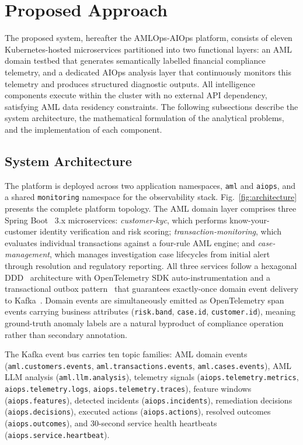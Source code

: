 \documentclass[a4paper,anonymous,UKenglish]{lipics-v2021}
\begin{document}
\section{Proposed Approach}
\label{sec:approach}

The proposed system, hereafter the AMLOps-AIOps platform, consists of eleven
Kubernetes-hosted microservices partitioned into two functional layers: an AML
domain testbed that generates semantically labelled financial compliance
telemetry, and a dedicated AIOps analysis layer that continuously monitors this
telemetry and produces structured diagnostic outputs. All intelligence
components execute within the cluster with no external API dependency,
satisfying AML data residency constraints. The following subsections describe
the system architecture, the mathematical formulation of the analytical
problems, and the implementation of each component.

\subsection{System Architecture}

The platform is deployed across two application namespaces, \texttt{aml} and
\texttt{aiops}, and a shared \texttt{monitoring} namespace for the
observability stack. Fig.~\ref{fig:architecture} presents the complete platform
topology. The AML domain layer comprises three Spring
Boot~\cite{springboot2014} 3.x microservices: \textit{customer-kyc}, which
performs know-your-customer identity verification and risk scoring;
\textit{transaction-monitoring}, which evaluates individual transactions against
a four-rule AML engine; and \textit{case-management}, which manages
investigation case lifecycles from initial alert through resolution and
regulatory reporting. All three services follow a hexagonal
DDD~\cite{evans2003ddd} architecture with OpenTelemetry SDK
auto-instrumentation and a transactional outbox
pattern~\cite{richardson2018microservices} that guarantees exactly-once domain
event delivery to Kafka~\cite{kafka2011,boten2022cloudnative}. Domain events
are simultaneously emitted as OpenTelemetry span events carrying business
attributes (\texttt{risk.band}, \texttt{case.id}, \texttt{customer.id}),
meaning ground-truth anomaly labels are a natural byproduct of compliance
operation rather than secondary annotation.

{\sloppy The Kafka event bus carries ten topic families: AML domain events
(\texttt{aml.customers.events}, \texttt{aml.transactions.events},
\texttt{aml.cases.events}), AML LLM analysis (\texttt{aml.llm.analysis}),
telemetry signals (\texttt{aiops.telemetry.metrics},
\texttt{aiops.telemetry.logs}, \texttt{aiops.telemetry.traces}), feature
windows (\texttt{aiops.features}), detected incidents (\texttt{aiops.incidents}),
remediation decisions (\texttt{aiops.decisions}), executed actions
(\texttt{aiops.actions}), resolved outcomes (\texttt{aiops.outcomes}), and
30-second service health heartbeats (\texttt{aiops.service.heartbeat}).\par}
\end{document}
